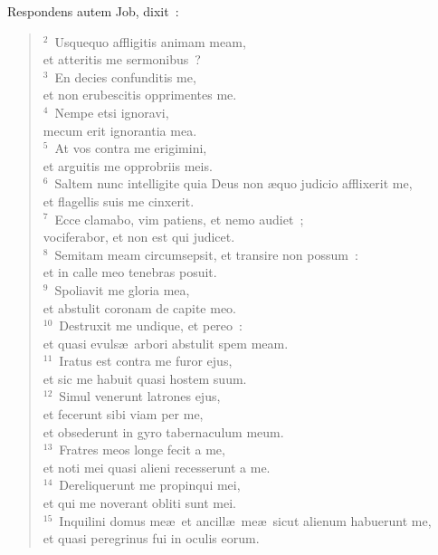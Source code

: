 \lettrine[lines=10,image=true,loversize=0.05,lraise=-0.03]{R}{}espondens autem Job, dixit~:
\begin{flushleft}\begin{verse}\vspace{6pt}${}^{2}$~Usquequo affligitis animam meam,\\ et atteritis me sermonibus~?\\
${}^{3}$~En decies confunditis me,\\ et non erubescitis opprimentes me.\\
${}^{4}$~Nempe etsi ignoravi,\\ mecum erit ignorantia mea.\\
${}^{5}$~At vos contra me erigimini,\\ et arguitis me opprobriis meis.\\
${}^{6}$~Saltem nunc intelligite quia Deus non \ae quo judicio afflixerit me,\\ et flagellis suis me cinxerit.\\
${}^{7}$~Ecce clamabo, vim patiens, et nemo audiet~;\\ vociferabor, et non est qui judicet.\\
${}^{8}$~Semitam meam circumsepsit, et transire non possum~:\\ et in calle meo tenebras posuit.\\
${}^{9}$~Spoliavit me gloria mea,\\ et abstulit coronam de capite meo.\\
${}^{10}$~Destruxit me undique, et pereo~:\\ et quasi evuls\ae\ arbori abstulit spem meam.\\
${}^{11}$~Iratus est contra me furor ejus,\\ et sic me habuit quasi hostem suum.\\
${}^{12}$~Simul venerunt latrones ejus,\\ et fecerunt sibi viam per me,\\ et obsederunt in gyro tabernaculum meum.\\
${}^{13}$~Fratres meos longe fecit a me,\\ et noti mei quasi alieni recesserunt a me.\\
${}^{14}$~Dereliquerunt me propinqui mei,\\ et qui me noverant obliti sunt mei.\\
${}^{15}$~Inquilini domus me\ae\ et ancill\ae\ me\ae\ sicut alienum habuerunt me,\\ et quasi peregrinus fui in oculis eorum.\\

\end{verse}
\end{flushleft}
